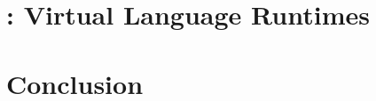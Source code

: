 \documentclass[a4paper,11pt,twoside]{include/ThesisStyle}
\begin{document}
\renewcommand{\baselinestretch}{1}\normalsize
\tableofcontents

\renewcommand{\baselinestretch}{1.2}\normalsize
\mainmatter
{}





\part{\VTT: Virtual Language Runtimes}





%

\part{Conclusion}







\appendix



\thispagestyle{empty}
\end{document}
